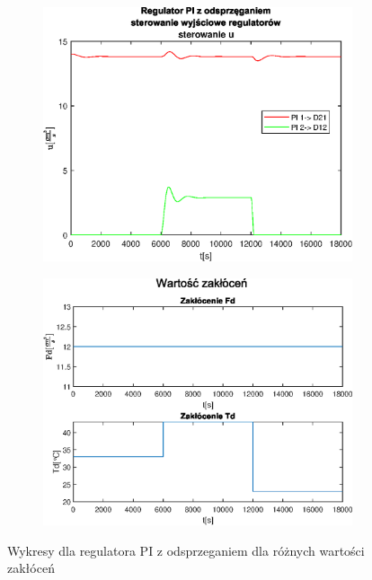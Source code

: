 \begin{figure}[h!]
   \begin{subfigure}[b]{0.4\textwidth}
      \includegraphics[width=1\linewidth]{img/PI/decoupler/disturbance/PIDecouplerControlD3DisttrueLinfalse.eps}
      \caption{}
      \label{fig:fig:PIDecoupler3DisttrueLinfalse3}
   \end{subfigure}
       
   \begin{subfigure}[b]{0.4\textwidth}
      \includegraphics[width=1\linewidth]{img/PI/decoupler/disturbance/PIDecouplerDisturbance3DisttrueLinfalse.eps}
      \caption{}
      \label{fig:fig:PIDecoupler3DisttrueLinfalse4}
   \end{subfigure}
       
   \caption{Wykresy dla regulatora PI z odsprzeganiem dla różnych wartości zakłóceń}
   \label{fig:PIDecoupler3DisttrueLinfalse}
\end{figure}
           
